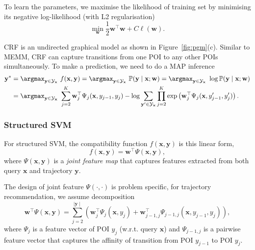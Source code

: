 To learn the parameters, we maximise the likelihood of training set by minimising its negative log-likelihood (with L2 regularisation)
\begin{equation}
\label{eq:traincrf}
\min_{\mathbf{w}} \frac{1}{2} \mathbf{w}^\top \mathbf{w} + C \ell(\mathbf{w}).
\end{equation}

CRF is an undirected graphical model as shown in Figure~\ref{fig:pgm}(c).
Similar to MEMM, CRF can capture transitions from one POI to any other POIs simultaneously.
To make a prediction, we need to do a MAP inference
\begin{equation}
\label{eq:testcrf}
\begin{aligned}
\mathbf{y}^* 
&= \argmax_{\mathbf{y} \in \mathcal{Y}_\mathbf{x}}~f(\mathbf{x}, \mathbf{y})
 = \argmax_{\mathbf{y} \in \mathcal{Y}_\mathbf{x}}~\mathbb{P}(\mathbf{y} \mid \mathbf{x}; \mathbf{w})
 = \argmax_{\mathbf{y} \in \mathcal{Y}_\mathbf{x}}~\log \mathbb{P}(\mathbf{y} \mid \mathbf{x}; \mathbf{w}) \\
&= \argmax_{\mathbf{y} \in \mathcal{Y}_\mathbf{x}}~\sum_{j=2}^{K} \mathbf{w}_j^\top \Psi_j(\mathbf{x}, y_{j-1}, y_j) -
   \log \sum_{\mathbf{y}' \in \mathcal{Y}_\mathbf{x}} \prod_{j=2}^{K} \exp \left( \mathbf{w}_j^\top \Psi_j(\mathbf{x}, y_{j-1}', y_j') \right).
\end{aligned}
\end{equation}



\subsubsection{Structured SVM}
\label{sec:ssvm}

For structured SVM, the compatibility function $f(\mathbf{x}, \mathbf{y})$ is this linear form,
\begin{equation*}
f(\mathbf{x}, \mathbf{y}) = \mathbf{w}^\top \Psi(\mathbf{x}, \mathbf{y}),
\end{equation*}
where $\Psi(\mathbf{x}, \mathbf{y})$ is a \emph{joint feature map} 
that captures features extracted from both query $\mathbf{x}$ and trajectory $\mathbf{y}$.

The design of joint feature $\Psi(\cdot,\cdot)$ is problem specific, 
for trajectory recommendation, we assume decomposition
\begin{equation*}
\label{eq:jointfeature}
\mathbf{w}^\top \Psi(\mathbf{x}, \mathbf{y}) 
= \sum_{j=2}^{\mid \mathbf{y} \mid} 
  \left( \mathbf{w}_j^\top \Psi_j(\mathbf{x}, y_j) + 
  \mathbf{w}_{j-1,j}^\top \Psi_{j-1, j}(\mathbf{x}, y_{j-1}, y_j) \right),
\end{equation*}
where $\Psi_j$ is a feature vector of POI $y_j$ (w.r.t. query $\mathbf{x}$)
and $\Psi_{j-1,j}$ is a pairwise feature vector that captures the affinity of transition from POI $y_{j-1}$ to POI $y_j$.

